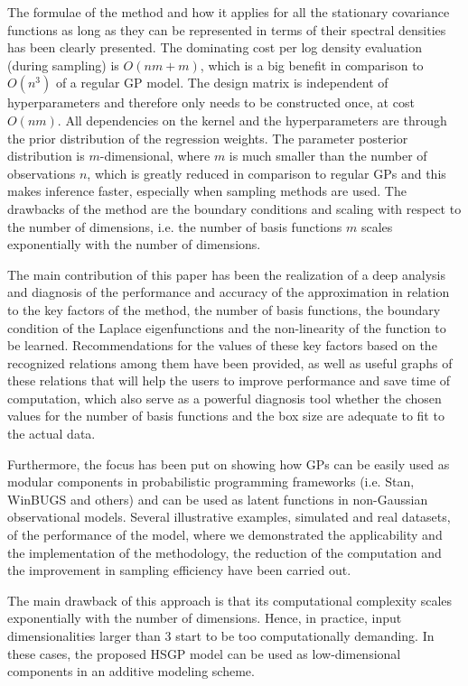 \documentclass[onecolumn,a4paper,11pt]{article}
\begin{document}
The formulae of the method and how it applies for all the stationary covariance functions as long as they can be represented in terms of their spectral densities has been clearly presented. The dominating cost per log density evaluation (during sampling) is $O(nm+m)$, which is a big benefit in comparison to $O(n^3)$ of a regular GP model. The design matrix is independent of hyperparameters and therefore only needs to be constructed once, at cost $O(nm)$. All dependencies on the kernel and the hyperparameters are through the prior distribution of the regression weights. The parameter posterior distribution is $m$-dimensional, where $m$ is much smaller than the number of observations $n$, which is greatly reduced in comparison to regular GPs and this makes inference faster, especially when sampling methods are used. The drawbacks of the method are the boundary conditions and scaling with respect to the number of dimensions, i.e. the number of basis functions $m$ scales exponentially with the number of dimensions.

The main contribution of this paper has been the realization of a deep analysis and diagnosis of the performance and accuracy of the approximation in relation to the key factors of the method, the number of basis functions, the boundary condition of the Laplace eigenfunctions and the non-linearity of the function to be learned. Recommendations for the values of these key factors based on the recognized relations among them have been provided, as well as useful graphs of these relations that will help the users to improve performance and save time of computation, which also serve as a powerful diagnosis tool whether the chosen values for the number of basis functions and the box size are adequate to fit to the actual data.

Furthermore, the focus has been put on showing how GPs can be easily used as modular components in probabilistic programming frameworks (i.e. Stan, WinBUGS and others) and can be used as latent functions in non-Gaussian observational models. Several illustrative examples, simulated and real datasets, of the performance of the model, where we demonstrated the applicability and the implementation of the methodology, the reduction of the computation and the improvement in sampling efficiency have been carried out.

The main drawback of this approach is that its computational complexity scales exponentially with the number of dimensions. Hence, in practice, input dimensionalities larger than 3 start to be too computationally demanding. In these cases, the proposed HSGP model can be used as low-dimensional components in an additive modeling scheme.
\end{document}
